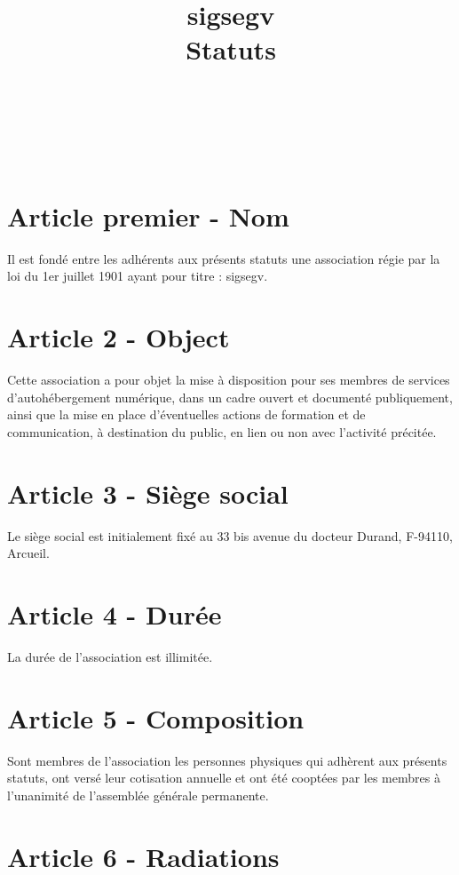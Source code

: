 \documentclass[a4paper,oneside,10pt]{article}
\begin{document}
\date{}
\title{sigsegv \\{\huge Statuts}}

{ \\
}

{\\
}


\section*{Article premier - Nom}

Il est fondé entre les adhérents aux présents statuts une association régie par la loi du 1er juillet 1901 ayant pour titre : sigsegv.

\section*{Article 2 - Object}

Cette association a pour objet la mise à disposition pour ses membres de services d’autohébergement numérique, dans un cadre ouvert et documenté publiquement, ainsi que la mise en place d’éventuelles actions de formation et de communication, à destination du public, en lien ou non avec l'activité précitée.

\section*{Article 3 - Siège social}

Le siège social est initialement fixé au 33 bis avenue du docteur Durand, F-94110, Arcueil.

\section*{Article 4 - Durée}

La durée de l'association est illimitée.

\section*{Article 5 - Composition}

Sont membres de l'association les personnes physiques qui adhèrent aux présents statuts, ont versé leur cotisation annuelle et ont été cooptées par les membres à l'unanimité de l'assemblée générale permanente.

\section*{Article 6 - Radiations}
\end{document}
